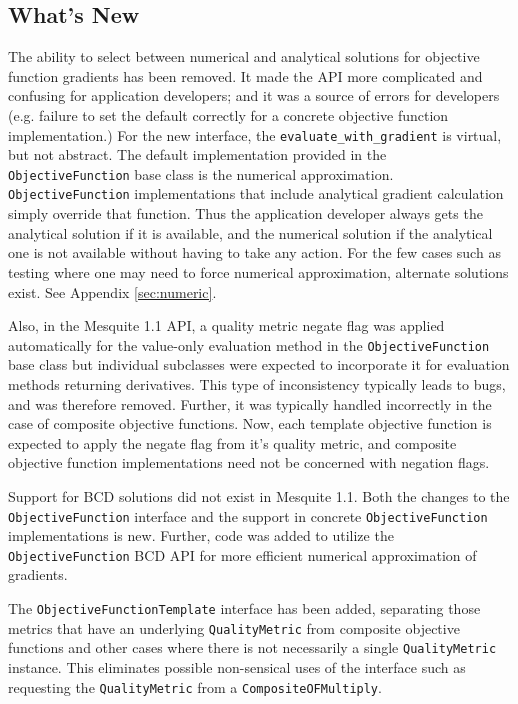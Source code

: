 \documentclass{article}
\begin{document}
\subsection{What's New}

The ability to select between numerical and analytical solutions for objective function gradients has been removed.  It made the API more complicated and confusing for application developers; and it was a source of errors for developers (e.g. failure to set the default correctly for a concrete objective function implementation.)  For the new interface, the \texttt{evaluate\_with\_gradient} is virtual, but not abstract.  The default implementation provided in the \texttt{ObjectiveFunction} base class is the numerical approximation.  \texttt{ObjectiveFunction} implementations that include analytical gradient calculation simply override that function.  Thus the application developer always gets the analytical solution if it is available, and the numerical solution if the analytical one is not available without having to take any action.  For the few cases such as testing where one may need to force numerical approximation, alternate solutions exist. See Appendix \ref{sec:numeric}.

Also, in the Mesquite 1.1 API, a quality metric negate flag was applied automatically for the value-only evaluation method in the \texttt{ObjectiveFunction} base class but individual subclasses were expected to incorporate it for evaluation methods returning derivatives.  This type of inconsistency typically leads to bugs, and was therefore removed.  Further, it was typically handled incorrectly in the case of composite objective functions.  Now, each template objective function is expected to apply the negate flag from it's quality metric, and composite objective function implementations need not be concerned with negation flags. 

Support for BCD solutions did not exist in Mesquite 1.1.  Both the changes to the \texttt{ObjectiveFunction} interface and the support in concrete \texttt{ObjectiveFunction} implementations is new.  Further, code was added to utilize the \texttt{ObjectiveFunction} BCD API for more efficient numerical approximation of gradients.

The \texttt{ObjectiveFunctionTemplate} interface has been added, separating those metrics that have an underlying \texttt{QualityMetric} from composite objective functions and other cases where there is not necessarily a single \texttt{QualityMetric} instance.  This eliminates possible non-sensical uses of the interface such as requesting the \texttt{QualityMetric} from a \texttt{CompositeOFMultiply}.
\end{document}
